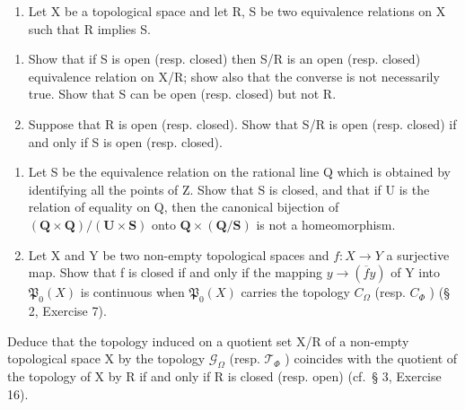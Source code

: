 \begin{enumerate}
\def\labelenumi{\arabic{enumi})}
\setcounter{enumi}{4}
\tightlist
\item
  Let X be a topological space and let R, S be two equivalence relations on X such that R implies S.
\end{enumerate}

\begin{enumerate}
\def\labelenumi{\alph{enumi})}
\tightlist
\item
  Show that if S is open (resp. closed) then S/R is an open (resp. closed) equivalence relation on X/R; show also that the converse is not necessarily true. Show that S can be open (resp. closed) but not R.
\item
  Suppose that R is open (resp. closed). Show that S/R is open (resp. closed) if and only if S is open (resp. closed).
\end{enumerate}

\begin{enumerate}
\def\labelenumi{\arabic{enumi})}
\setcounter{enumi}{5}
\item
  Let S be the equivalence relation on the rational line Q which is obtained by identifying all the points of Z. Show that S is closed, and that if U is the relation of equality on Q, then the canonical bijection of \((\mathbf{Q} \times \mathbf{Q}) / (\mathbf{U} \times \mathbf{S})\) onto \(\mathbf{Q} \times (\mathbf{Q}/\mathbf{S})\) is not a homeomorphism.
\item
  Let X and Y be two non-empty topological spaces and \(f: X \to Y\) a surjective map. Show that f is closed if and only if the mapping \(y \to (\overline{f} y)\) of Y into \(\mathfrak{P}_{0}(X)\) is continuous when \(\mathfrak{P}_{0}(X)\) carries the topology \(C_{\Omega}\) (resp. \(C_{\Phi}\) ) (§ 2, Exercise 7).
\end{enumerate}

Deduce that the topology induced on a quotient set X/R of a non-empty topological space X by the topology \(\mathcal{G}_{\Omega}\) (resp. \(\mathcal{T}_{\Phi}\) ) coincides with the quotient of the topology of X by R if and only if R is closed (resp. open) (cf.~§ 3, Exercise 16).

